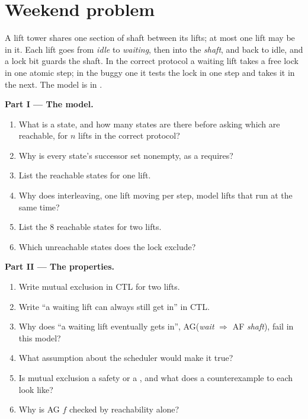 \section{Weekend problem}\label{sec:b3:program-verification:problem}

\begin{problem}\label{pb:b3:program-verification:1}
A lift tower shares one section of shaft between its lifts; at most one lift may be in it. Each lift goes from \emph{idle} to \emph{waiting}, then into the \emph{shaft}, and back to idle, and a lock bit guards the shaft. In the correct protocol a waiting lift takes a free lock in one atomic step; in the buggy one it tests the lock in one step and takes it in the next. The model is in .

\label{lst:b3:program-verification:lifts}

\label{out:b3:program-verification:lifts}

\medskip\noindent\textbf{Part I --- The model.}
\begin{enumerate}
  \item What is a state, and how many states are there before asking which are reachable, for $n$ lifts in the correct protocol?
  \item Why is every state's successor set nonempty, as a  requires?
  \item List the reachable states for one lift.
  \item Why does interleaving, one lift moving per step, model lifts that run at the same time?
  \item List the 8 reachable states for two lifts.
  \item Which unreachable states does the lock exclude?
\end{enumerate}

\medskip\noindent\textbf{Part II --- The properties.}
\begin{enumerate}[resume]
  \item Write mutual exclusion in CTL for two lifts.
  \item Write ``a waiting lift can always still get in'' in CTL.
  \item Why does ``a waiting lift eventually gets in'', AG(\textit{wait} $\Rightarrow$ AF \textit{shaft}), fail in this model?
  \item What assumption about the scheduler would make it true?
  \item Is mutual exclusion a safety or a , and what does a counterexample to each look like?
  \item Why is AG $f$ checked by reachability alone?
\end{enumerate}


\end{problem}
